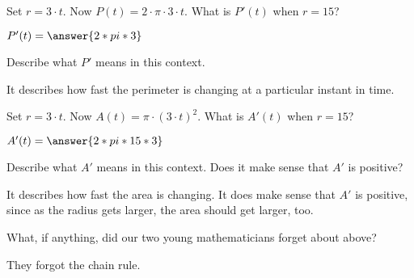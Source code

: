 \documentclass{ximera}
\begin{document}
\begin{problem}
  Set $r=3\cdot t$. Now $P(t) = 2\cdot \pi\cdot 3\cdot t$. What is
  $P'(t)$ when $r=15$?
  \begin{prompt}
    $P'(t)=\answer{2*pi*3}$
  \end{prompt}
\end{problem}

\begin{problem}
  Describe what $P'$ means in this context.
  \begin{freeResponse}
    It describes how fast the perimeter is changing at a particular
    instant in time.
  \end{freeResponse}
\end{problem}

\begin{problem}
  Set $r=3\cdot t$. Now $A(t) = \pi\cdot (3\cdot t)^2$. What is
  $A'(t)$ when $r=15$?
  \begin{prompt}
    $A'(t)=\answer{2*pi*15*3}$
  \end{prompt}
\end{problem}

\begin{problem}
  Describe what $A'$ means in this context.  Does it make sense that
  $A'$ is positive?
  \begin{freeResponse}
    It describes how fast the area is changing.  It does make sense that
    $A'$ is positive, since as the radius gets larger, the area should
    get larger, too.
  \end{freeResponse}
\end{problem}

\begin{problem}
  What, if anything, did our two young mathematicians forget about above?
  \begin{freeResponse}
 They forgot the chain rule.
  \end{freeResponse}
\end{problem}


\end{document}
